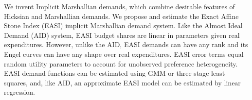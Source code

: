 We invent Implicit Marshallian demands, which combine desirable features of Hicksian and Marshallian demands. We propose and estimate the Exact Affine Stone Index (EASI) implicit Marshallian demand system. Like the Almost Ideal Demand (AID) system, EASI budget shares are linear in parameters given real expenditures. However, unlike the AID, EASI demands can have any rank and its Engel curves can have any shape over real expenditures. EASI error terms equal random utility parameters to account for unobserved preference heterogeneity. EASI demand functions can be estimated using GMM or three stage least squares, and, like AID, an approximate EASI model can be estimated by linear regression.

